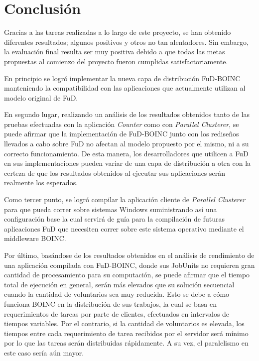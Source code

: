 \chapter{Conclusión}
\label{chapter:conclusion}

Gracias a las tareas realizadas a lo largo de este proyecto, se han obtenido diferentes resultados; algunos positivos y otros no tan alentadores. Sin embargo, la evaluación final resulta ser muy positiva debido a que todas las metas propuestas al comienzo del proyecto fueron cumplidas satisfactoriamente.

En principio se logró implementar la nueva capa de distribución FuD-BOINC manteniendo la compatibilidad con las aplicaciones que actualmente utilizan al modelo original de FuD.

En segundo lugar, realizando un análisis de los resultados obtenidos tanto de las pruebas efectuadas con la aplicación \textit{Counter} como con \textit{Parallel Clusterer}, se puede afirmar que la implementación de FuD-BOINC junto con los rediseños llevados a cabo sobre FuD no afectan al modelo propuesto por el mismo, ni a su correcto funcionamiento. De esta manera, los desarrolladores que utilicen a FuD en sus implementaciones pueden variar de una capa de distribución a otra con la certeza de que los resultados obtenidos al ejecutar sus aplicaciones serán realmente los esperados.

Como tercer punto, se logró compilar la aplicación cliente de \textit{Parallel Clusterer} para que pueda correr sobre sistemas Windows suministrando así una configuración base la cual servirá de guía para la compilación de futuras aplicaciones FuD que necesiten correr sobre este sistema operativo mediante el middleware BOINC.

Por último, basándose de los resultados obtenidos en el análisis de rendimiento de una aplicación compilada con FuD-BOINC, donde sus JobUnits no requieren gran cantidad de procesamiento para su computación, se puede afirmar que el tiempo total de ejecución en general, serán más elevados que su solución secuencial cuando la cantidad de voluntarios sea muy reducida. Esto se debe a cómo funciona BOINC en la distribución de sus trabajos, la cual se basa en requerimientos de tareas por parte de clientes, efectuados en intervalos de tiempos variables. Por el contrario, si la cantidad de voluntarios es elevada, los tiempos entre cada requerimiento de tarea recibidos por el servidor será mínimo por lo que las tareas serán distribuidas rápidamente. A su vez, el paralelismo en este caso sería aún mayor.